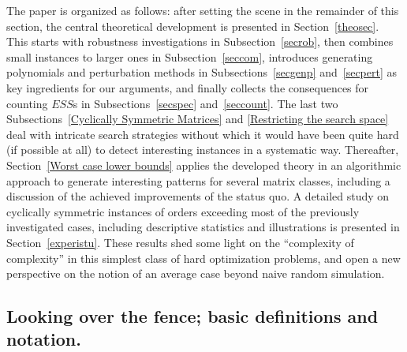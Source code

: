 \documentclass[moor]{informs3}              %
\def\coma#1{{#1}}
\begin{document}
\coma{The paper is organized as follows: after setting the scene in the remainder of this section, the central theoretical development is presented in Section~\ref{theosec}. This starts with robustness investigations in Subsection~\ref{secrob}, then combines small instances to larger ones in Subsection~\ref{seccom}, introduces generating polynomials and perturbation methods in Subsections~\ref{secgenp} and~\ref{secpert} as key ingredients for our arguments, and finally collects the consequences for counting $ESS$s in Subsections~\ref{secspec} and~\ref{seccount}. The last two Subsections~\ref{Cyclically Symmetric Matrices} and \ref{Restricting the search space} deal with intricate search strategies without which it would have been quite hard (if possible at all) to detect interesting instances in a systematic way. Thereafter, Section~\ref{Worst case lower bounds} applies the developed theory in an algorithmic approach to generate interesting patterns for several matrix classes, including a discussion of the achieved improvements of the status quo. A detailed study on cyclically symmetric instances of orders exceeding most of the previously investigated cases, including descriptive statistics and illustrations is presented in Section~\ref{experistu}. These results shed some light on the ``complexity of complexity'' in this simplest class of hard optimization problems, and open a new perspective on the notion of an average case beyond naive random simulation.
}

\subsection{Looking over the fence; basic definitions and notation.}
\end{document}
